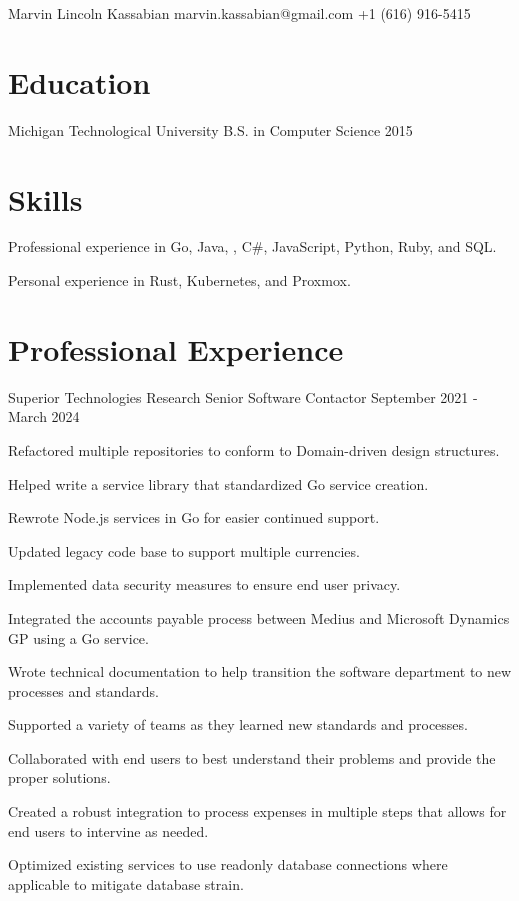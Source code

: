 \documentclass{marvinkassabian_resume}
\begin{document}
	\resumeheadersimple
			{Marvin Lincoln Kassabian}
			{marvin.kassabian@gmail.com}
			{+1 (616) 916-5415}
	\section{Education}
		\subsectionlocationdate
				{Michigan Technological University}
				{B.S. in Computer Science}
				{2015}
	\section{Skills}
		\resumesublistbegin
			\item Professional experience in Go, Java, \cpp, C\#, JavaScript, Python, Ruby, and SQL.
			\item Personal experience in Rust, Kubernetes, and Proxmox.
		\resumesublistend
	\section{Professional Experience}
		\subsectionpositiondate
				{Superior Technologies Research}
				{Senior Software Contactor}
				{September 2021 - March 2024}
			\resumesublistbegin
				\item Refactored multiple repositories to conform to Domain-driven design structures.
				\item Helped write a service library that standardized Go service creation.
				\item Rewrote Node.js services in Go for easier continued support.
				\item Updated legacy code base to support multiple currencies.
				\item Implemented data security measures to ensure end user privacy.
				\item Integrated the accounts payable process between Medius and Microsoft Dynamics GP using a Go service.
				\item Wrote technical documentation to help transition the software department to new processes and standards.
				\item Supported a variety of teams as they learned new standards and processes.
				\item Collaborated with end users to best understand their problems and provide the proper solutions.
				\item Created a robust integration to process expenses in multiple steps that allows for end users to intervine as needed.
				\item Optimized existing services to use readonly database connections where applicable to mitigate database strain.
\end{document}
